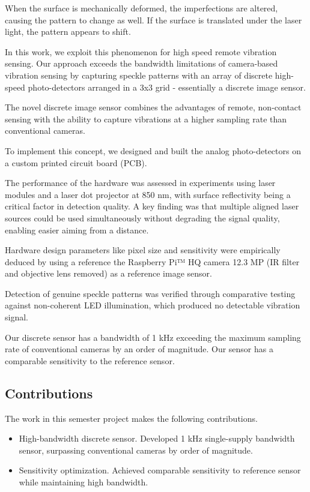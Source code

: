 When the surface is mechanically deformed, the imperfections are altered, causing the pattern to change as well. If the surface is translated under the laser light, the pattern appears to shift.

In this work, we exploit this phenomenon for high speed remote vibration sensing. Our approach exceeds the bandwidth limitations of camera-based vibration sensing by capturing 
speckle patterns with an array of discrete high-speed photo-detectors arranged in a 3x3 grid - essentially a discrete image sensor.

The novel discrete image sensor combines the advantages of remote, non-contact sensing with the ability to capture vibrations at a higher sampling rate than conventional cameras.

To implement this concept, we designed and built the analog photo-detectors on a custom printed circuit board (PCB).

The performance of the hardware was assessed in experiments using laser modules and a laser dot projector at 850 \si{\nano\meter}, 
with surface reflectivity being a critical factor in detection quality. A key finding was that multiple aligned laser sources could be used simultaneously without degrading the signal quality, 
enabling easier aiming from a distance.

Hardware design parameters like pixel size and sensitivity were empirically deduced by using a reference the Raspberry Pi™ HQ camera 12.3 MP (IR filter and objective lens removed) as a reference image sensor.

Detection of genuine speckle patterns was verified through comparative testing against non-coherent LED illumination, which produced no detectable vibration signal.

Our discrete sensor has a bandwidth of 1 \si{\kilo\hertz} exceeding the maximum sampling rate of conventional cameras by an order of magnitude. Our sensor has a comparable sensitivity to the reference sensor. 

\subsection{Contributions}

The work in this semester project makes the following contributions.

\begin{itemize}
    \item High-bandwidth discrete sensor. Developed 1 kHz single-supply bandwidth sensor, surpassing conventional cameras by order of magnitude.
    \item Sensitivity optimization. Achieved comparable sensitivity to reference sensor while maintaining high bandwidth.
\end{itemize}